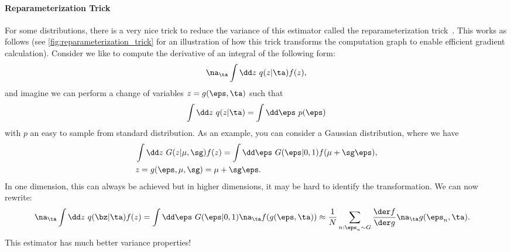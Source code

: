 \documentclass{lecture}
\begin{document}
\paragraph{Reparameterization Trick}
For some distributions, there is a very nice trick to reduce the variance of this estimator called the reparameterization trick~\cite{Kingma2014Autoencoding}. This works as follows (see \cref{fig:reparameterization_trick} for an illustration of how this trick transforms the computation graph to enable efficient gradient calculation). Consider we like to compute the derivative of an integral of the following form:
\begin{align}
	\na_\ta \int\dd z~ q(z|\ta) f(z),
\end{align}
and imagine we can perform a change of variables $z=g(\eps,\ta)$ such that
\begin{align}
	\int\dd z~ q(z|\ta)=\int\dd\eps~ p(\eps)
\end{align}
with $p$ an easy to sample from standard distribution. As an example, you can consider a Gaussian distribution, where we have
\begin{align}
	 &\int\dd z ~G(z|\mu,\sg) f(z)= \int\dd \eps~G(\eps|0,1) f(\mu+\sg\eps),\\
	 &z = g(\eps,\mu,\sg) = \mu + \sg\eps.
\end{align}
In one dimension, this can always be achieved but in higher dimensions, it may be hard to identify the transformation. We can now rewrite:
\begin{align}
	 &\na_\ta \int\dd z~ q(\bz|\ta) f(z) = \int\dd \eps~G(\eps|0,1)\na_\ta f(g(\eps,\ta))\approx \frac{1}{N}\sum_{n:\eps_n\sim G} \frac{\der f}{\der g}\na_\ta g(\eps_n,\ta).
\end{align}
This estimator has much better variance properties!
\end{document}
